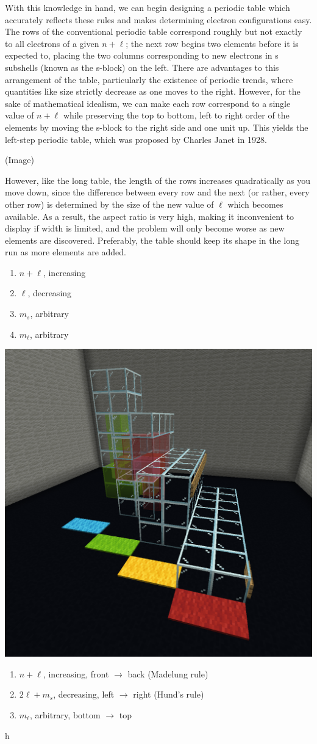 \documentclass{article}
\begin{document}
With this knowledge in hand, we can begin designing a periodic table
which accurately reflects these rules
and makes determining electron configurations easy.
The rows of the conventional periodic table
correspond roughly but not exactly to all electrons of a given $n+\ell$;
the next row begins two elements before it is expected to,
placing the two columns corresponding to new electrons in s subshells
(known as the s-block) on the left.
There are advantages to this arrangement of the table,
particularly the existence of periodic trends,
where quantities like size strictly decrease as one moves to the right.
However, for the sake of mathematical idealism,
we can make each row correspond to a single value of $n+\ell$
while preserving the top to bottom, left to right order of the elements
by moving the s-block to the right side and one unit up.
This yields the left-step periodic table,
which was proposed by Charles Janet in 1928.

(Image)

However, like the long table,
the length of the rows increases quadratically as you move down,
since the difference between every row and the next (or rather, every other row)
is determined by the size of the new value of $\ell$ which becomes available.
As a result, the aspect ratio is very high,
making it inconvenient to display if width is limited,
and the problem will only become worse as new elements are discovered.
Preferably, the table should keep its shape in the long run as more elements are added.

\begin{enumerate}
\item $n+\ell$, increasing
\item $\ell$, decreasing
\item $m_s$, arbitrary
\item $m_\ell$, arbitrary
\end{enumerate}

\begin{center}
  \includegraphics[width=0.5\linewidth]{mc1.png}
\end{center}

\begin{enumerate}
\item $n+\ell$, increasing, front $\rightarrow$ back (Madelung rule)
\item $2\ell+m_s$, decreasing, left $\rightarrow$ right (Hund's rule)
\item $m_\ell$, arbitrary, bottom $\rightarrow$ top
\end{enumerate}

\newpage

h
\end{document}
